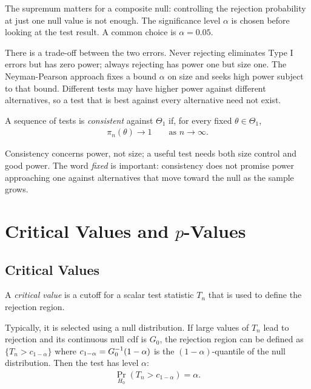 \documentclass[a4paper,12pt]{article}
\begin{document}
\begin{remark}
	The supremum matters for a composite null: controlling the rejection probability at just one null value is not enough.
	The significance level $\alpha$ is chosen before looking at the test result.
	A common choice is $\alpha=0.05$.
\end{remark}

\begin{remark}
	There is a trade-off between the two errors.
	Never rejecting eliminates Type I errors but has zero power;
	always rejecting has power one but size one.
	The Neyman-Pearson approach fixes a bound $\alpha$ on size
	and seeks high power subject to that bound.
	Different tests may have higher power against different alternatives,
	so a test that is best against every alternative need not exist.
\end{remark}

\begin{definition}
	A sequence of tests is \emph{consistent} against $\Theta_1$ if,
	for every fixed $\theta\in\Theta_1$,
	\begin{align}
		\pi_n(\theta)\to1\qquad\text{as }n\to\infty.
	\end{align}
\end{definition}

\begin{remark}
	Consistency concerns power, not size; a useful test needs both size control and good power.
	The word \emph{fixed} is important: consistency does not promise power approaching one
	against alternatives that move toward the null as the sample grows.
\end{remark}

\section{Critical Values and \texorpdfstring{$p$}{p}-Values}

\subsection{Critical Values}

\begin{definition}
	A \emph{critical value} is a cutoff for a scalar test statistic $T_n$
	that is used to define the rejection region.
\end{definition}

\begin{remark}
	Typically, it is selected using a null distribution.
	If large values of $T_n$ lead to rejection and its continuous null \gls{cdf} is $G_0$,
	the rejection region can be defined as $\{T_n>c_{1-\alpha}\}$
	where $c_{1-\alpha}=G_0^{-1}(1-\alpha)$ is the $(1-\alpha)$-quantile of the null distribution.
	Then the test has level $\alpha$:
	\begin{align}
		\Pr_{H_0}(T_n>c_{1-\alpha})=\alpha.
	\end{align}
\end{remark}
\end{document}
